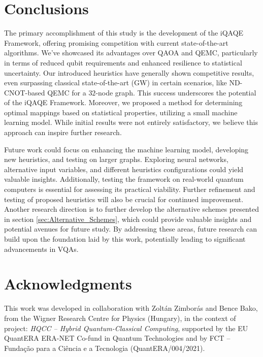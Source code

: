 \section{Conclusions}
\label{sec:Conclusions}
The primary accomplishment of this study is the development of the iQAQE Framework, offering promising competition with current state-of-the-art algorithms. We've showcased its advantages over QAOA and QEMC, particularly in terms of reduced qubit requirements and enhanced resilience to statistical uncertainty. Our introduced heuristics have generally shown competitive results, even surpassing classical state-of-the-art (GW) in certain scenarios, like ND-CNOT-based QEMC for a $32$-node graph. This success underscores the potential of the iQAQE Framework. Moreover, we proposed a method for determining optimal mappings based on statistical properties, utilizing a small machine learning model. While initial results were not entirely satisfactory, we believe this approach can inspire further research.

Future work could focus on enhancing the machine learning model, developing new heuristics, and testing on larger graphs. Exploring neural networks, alternative input variables, and different heuristics configurations could yield valuable insights. Additionally, testing the framework on real-world quantum computers is essential for assessing its practical viability. Further refinement and testing of proposed heuristics will also be crucial for continued improvement. Another research direction is to further develop the alternative schemes presented in section \ref{sec:Alternative_Schemes}, which could provide valuable insights and potential avenues for future study. By addressing these areas, future research can build upon the foundation laid by this work, potentially leading to significant advancements in VQAs.


\section*{Acknowledgments}
\label{sec:Acknowledgments}
This work was developed in collaboration with Zoltán Zimborás and Bence Bako, from the Wigner Research Centre for Physics (Hungary), in the context of project: \textit{HQCC – Hybrid Quantum-Classical Computing}, supported by the EU QuantERA ERA-NET Co-fund in Quantum Technologies and by FCT -- Funda\c{c}\~{a}o para a Ci\^{e}ncia e a Tecnologia (QuantERA/004/2021).

